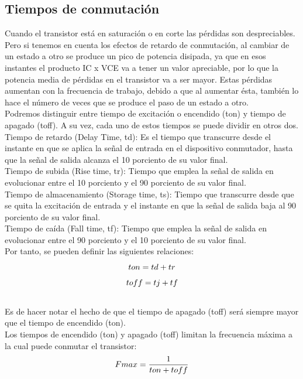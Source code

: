 \documentclass[12pt,a4paper]{article}
\begin{document}
\subsection{Tiempos de conmutación}
Cuando el transistor está en saturación o en corte las pérdidas son despreciables. Pero si tenemos en cuenta los efectos de retardo de conmutación, al cambiar de un estado a otro se produce un pico de potencia disipada, ya que en esos instantes el producto I{\tiny C } x V{\tiny CE} va a tener un valor apreciable, por lo que la potencia media de pérdidas en el transistor va a ser mayor. Estas pérdidas aumentan con la frecuencia de trabajo, debido a que al aumentar ésta, también lo hace el número de veces que se produce el paso de un estado a otro.\\
Podremos distinguir entre tiempo de excitación o encendido (ton) y tiempo de apagado (toff). A su vez, cada uno de estos tiempos se puede dividir en otros dos.\\
Tiempo de retardo (Delay Time, td): Es el tiempo que transcurre desde el instante en que se aplica la señal de entrada en el dispositivo conmutador, hasta que la señal de salida alcanza el 10 porciento de su valor final.\\
Tiempo de subida (Rise time, tr): Tiempo que emplea la señal de salida en evolucionar entre el 10 porciento y el 90 porciento de su valor final.\\
Tiempo de almacenamiento (Storage time, ts): Tiempo que transcurre desde que se quita la excitación de entrada y el instante en que la señal de salida baja al 90 porciento de su valor final.\\
Tiempo de caída (Fall time, tf): Tiempo que emplea la señal de salida en evolucionar entre el 90 porciento y el 10 porciento de su valor final.\\
Por tanto, se pueden definir las siguientes relaciones:\\
$$t {\tiny on}=t {\tiny d}+t {\tiny r}$$
$$t {\tiny off}=t {\tiny j}+t {\tiny f}$$\\
Es de hacer notar el hecho de que el tiempo de apagado (toff) será siempre mayor que el tiempo de encendido (ton).\\
Los tiempos de encendido (ton) y apagado (toff) limitan la frecuencia máxima a la cual puede conmutar el transistor:\\
$$F{\tiny max}= \dfrac{1}{ton+toff}$$
\end{document}

